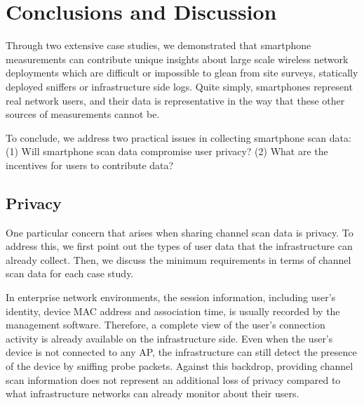 \section{Conclusions and Discussion}
\label{sec:conclusion}

Through two extensive case studies, we demonstrated that smartphone
measurements can contribute unique insights about large scale wireless network
deployments which are difficult or impossible to glean from site surveys,
statically deployed sniffers or infrastructure side logs. Quite simply,
smartphones represent real network users, and their data is representative in
the way that these other sources of measurements cannot be.

To conclude, we address two practical issues in collecting smartphone
scan data: (1) Will smartphone scan data compromise user privacy? (2) What
are the incentives for users to contribute data? 

\begin{comment}
\begin{table*}[t!]
  \centering
  \begin{tabular}{cccccccc}
    
  \end{tabular}
  \caption{\textbf{Summary of Data Required for Each Case Study.} $\times$: Not
  required. $\diamond$: Optional. $\surd$: Required.}
  \label{tab:privacy}
  \vspace*{\aftercaptiongap}
\end{table*}
\end{comment}

\subsection{Privacy}
\label{subsec:privacy}

One particular concern that arises when sharing channel scan data is privacy.
To address this, we first point out the types of user data that the
infrastructure can already collect. Then, we discuss the minimum
requirements in terms of channel scan data for each case study.

In enterprise network environments, the \wifi{} session information,
including user's identity, device MAC address and association time, is usually
recorded by the management software. Therefore, a complete view of the user's
\wifi{} connection activity is already available on the infrastructure side.
Even when the user's device is not connected to any AP, the infrastructure
can still detect the presence of the device by sniffing probe
packets. Against this backdrop,
providing channel scan information does not represent an additional loss of
privacy compared to what infrastructure networks can already monitor about
their users.

